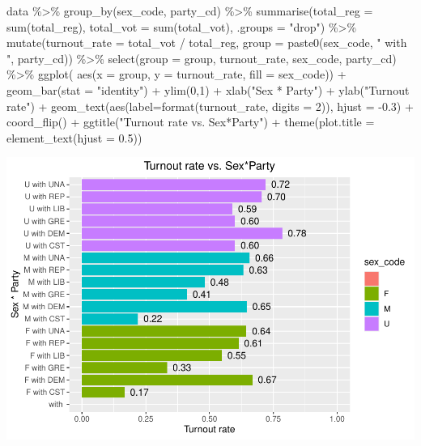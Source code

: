 \documentclass[
]{article}
\newenvironment{Shaded}{\begin{snugshade}}{\end{snugshade}}
\newcommand{\AttributeTok}[1]{\textcolor[rgb]{0.77,0.63,0.00}{#1}}
\newcommand{\DecValTok}[1]{\textcolor[rgb]{0.00,0.00,0.81}{#1}}
\newcommand{\FloatTok}[1]{\textcolor[rgb]{0.00,0.00,0.81}{#1}}
\newcommand{\FunctionTok}[1]{\textcolor[rgb]{0.00,0.00,0.00}{#1}}
\newcommand{\NormalTok}[1]{#1}
\newcommand{\SpecialCharTok}[1]{\textcolor[rgb]{0.00,0.00,0.00}{#1}}
\newcommand{\StringTok}[1]{\textcolor[rgb]{0.31,0.60,0.02}{#1}}
\begin{document}
\begin{Shaded}
\begin{Highlighting}[]
\NormalTok{data }\SpecialCharTok{\%\textgreater{}\%}
  \FunctionTok{group\_by}\NormalTok{(sex\_code, party\_cd) }\SpecialCharTok{\%\textgreater{}\%}
  \FunctionTok{summarise}\NormalTok{(}\AttributeTok{total\_reg =} \FunctionTok{sum}\NormalTok{(total\_reg),}
            \AttributeTok{total\_vot =} \FunctionTok{sum}\NormalTok{(total\_vot), }\AttributeTok{.groups =} \StringTok{"drop"}\NormalTok{) }\SpecialCharTok{\%\textgreater{}\%}
  \FunctionTok{mutate}\NormalTok{(}\AttributeTok{turnout\_rate =}\NormalTok{ total\_vot }\SpecialCharTok{/}\NormalTok{ total\_reg,}
         \AttributeTok{group =} \FunctionTok{paste0}\NormalTok{(sex\_code, }\StringTok{" with "}\NormalTok{, party\_cd)) }\SpecialCharTok{\%\textgreater{}\%}
  \FunctionTok{select}\NormalTok{(}\AttributeTok{group =}\NormalTok{ group, turnout\_rate, sex\_code, party\_cd) }\SpecialCharTok{\%\textgreater{}\%}
  \FunctionTok{ggplot}\NormalTok{( }\FunctionTok{aes}\NormalTok{(}\AttributeTok{x =}\NormalTok{ group, }\AttributeTok{y =}\NormalTok{ turnout\_rate, }\AttributeTok{fill =}\NormalTok{ sex\_code)) }\SpecialCharTok{+}
  \FunctionTok{geom\_bar}\NormalTok{(}\AttributeTok{stat =} \StringTok{"identity"}\NormalTok{) }\SpecialCharTok{+}
  \FunctionTok{ylim}\NormalTok{(}\DecValTok{0}\NormalTok{,}\DecValTok{1}\NormalTok{) }\SpecialCharTok{+}
  \FunctionTok{xlab}\NormalTok{(}\StringTok{"Sex * Party"}\NormalTok{) }\SpecialCharTok{+} \FunctionTok{ylab}\NormalTok{(}\StringTok{"Turnout rate"}\NormalTok{) }\SpecialCharTok{+}
  \FunctionTok{geom\_text}\NormalTok{(}\FunctionTok{aes}\NormalTok{(}\AttributeTok{label=}\FunctionTok{format}\NormalTok{(turnout\_rate, }\AttributeTok{digits =} \DecValTok{2}\NormalTok{)), }\AttributeTok{hjust =} \SpecialCharTok{{-}}\FloatTok{0.3}\NormalTok{) }\SpecialCharTok{+}
  \FunctionTok{coord\_flip}\NormalTok{() }\SpecialCharTok{+}
  \FunctionTok{ggtitle}\NormalTok{(}\StringTok{"Turnout rate vs. Sex*Party"}\NormalTok{) }\SpecialCharTok{+}
    \FunctionTok{theme}\NormalTok{(}\AttributeTok{plot.title =} \FunctionTok{element\_text}\NormalTok{(}\AttributeTok{hjust =} \FloatTok{0.5}\NormalTok{))}
\end{Highlighting}
\end{Shaded}

\includegraphics{CS2_files/figure-latex/unnamed-chunk-14-1.pdf}
\end{document}
